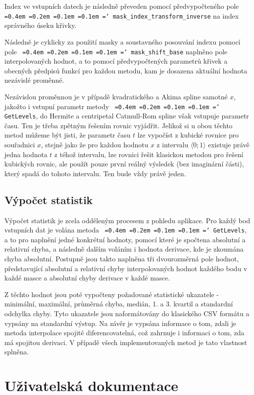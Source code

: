 \documentclass[]{thesiskiv}
\newcommand*\justify{
  \fontdimen2\font=0.4em
  \fontdimen3\font=0.2em
  \fontdimen4\font=0.1em
  \fontdimen7\font=0.1em
  \hyphenchar\font=`\-
}
\begin{document}
Index ve vstupních datech je následně převeden pomocí předvypočteného pole \texttt{\justify mask\_index\_transform\_inverse} na index správného úseku křivky.

Následně je cyklicky za použití masky a soustavného posouvání indexu pomocí pole \texttt{\justify mask\_shift\_base} naplněno pole interpolovaných hodnot, a to pomocí předvypočtených parametrů křivek a obecných předpisů funkcí pro každou metodu, kam je dosazena aktuální hodnota nezávislé proměnné.

Nezávislou proměnnou je v případě kvadratického a Akima spline samotné $x$, jakožto i vstupní parametr metody \texttt{\justify GetLevels}, do Hermite a centripetal Catmull-Rom spline však vstupuje parametr času. Ten je třeba zpětným řešením rovnic vyjádřit. Jelikož si u obou těchto metod můžeme být jisti, že parametr času $t$ lze vypočíst z kubické rovnice pro souřadnici $x$, stejně jako že pro každou hodnotu $x$ z intervalu $\langle 0 ; 1 \rangle$ existuje právě jedna hodnota $t$ z téhož intervalu, lze rovnici řešit klasickou metodou pro řešení kubických rovnic, ale použít pouze první reálný výsledek (bez imaginární části), který spadá do tohoto intervalu. Ten bude vždy právě jeden.

\section{Výpočet statistik}\label{impl:stat}

Výpočet statistik je zcela odděleným procesem z pohledu aplikace. Pro každý bod vstupních dat je volána metoda \texttt{\justify GetLevels}, a to pro naplnění jedné konkrétní hodnoty, pomocí které je spočtena absolutní a relativní chyba, a následně dalším voláním i hodnota derivace, kde je zkoumána chyba absolutní. Postupně jsou takto naplněna tři dvourozměrná pole hodnot, představující absolutní a relativní chyby interpolovaných hodnot každého bodu v každé masce a absolutní chyby derivace v každé masce.

Z těchto hodnot jsou poté vypočteny požadované statistické ukazatele - minimální, maximální, průměrná chyba, medián, 1. a 3. kvartil a standardní odchylka chyby. Tyto ukazatele jsou naformátovány do klasického CSV formátu a vypsány na standardní výstup. Na závěr je vypsána informace o tom, zdali je metoda interpolace spojitě diferencovatelná, což zahrnuje i informaci o tom, zda má spojitou derivaci. V případě všech implementovaných metod je tato vlastnost splněna.

\chapter{Uživatelská dokumentace}
\end{document}
